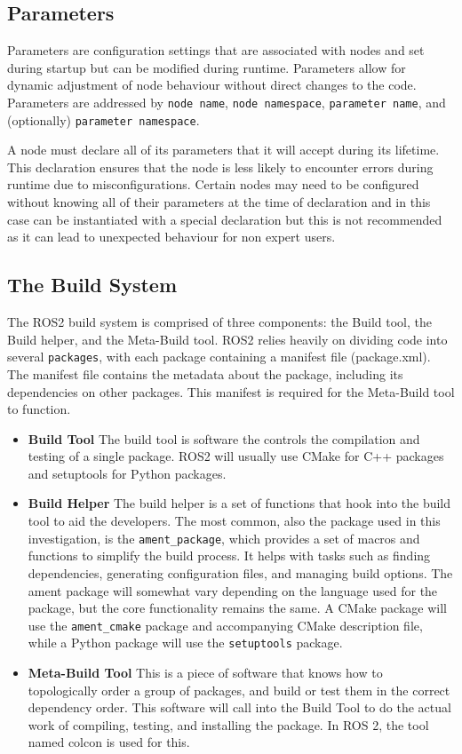 \documentclass[10pt,a4paper,english]{article}
\begin{document}
\subsection{Parameters}
Parameters are configuration settings that are associated with nodes and set during startup but can be modified during runtime. Parameters allow for dynamic adjustment of node behaviour without direct changes to the code. Parameters are addressed by \texttt{node name}, \texttt{node namespace}, \texttt{parameter name}, and (optionally) \texttt{parameter namespace}. \par
A node must declare all of its parameters that it will accept during its lifetime. This declaration ensures that the node is less likely to encounter errors during runtime due to misconfigurations. Certain nodes may need to be configured without knowing all of their parameters at the time of declaration and in this case can be instantiated with a special declaration but this is not recommended as it can lead to unexpected behaviour for non expert users. \par

\subsection{The Build System}
The ROS2 build system is comprised of three components: the Build tool, the Build helper, and the Meta-Build tool. ROS2 relies heavily on dividing code into several \texttt{packages}, with each package containing a manifest file (package.xml). The manifest file contains the metadata about the package, including its dependencies on other packages. This manifest is required for the Meta-Build tool to function.

\begin{itemize}
    \item \textbf{Build Tool}
    The build tool is software the controls the compilation and testing of a single package. ROS2 will usually use CMake for C++ packages and setuptools for Python packages.
    \item \textbf{Build Helper}
    The build helper is a set of functions that hook into the build tool to aid the developers. The most common, also the package used in this investigation, is the \texttt{ament\_package}, which provides a set of macros and functions to simplify the build process. It helps with tasks such as finding dependencies, generating configuration files, and managing build options. The ament package will somewhat vary depending on the language used for the package, but the core functionality remains the same. A CMake package will use the \texttt{ament\_cmake} package and accompanying CMake description file, while a Python package will use the \texttt{setuptools} package.
    \item \textbf{Meta-Build Tool}
    This is a piece of software that knows how to topologically order a group of packages, and build or test them in the correct dependency order. This software will call into the Build Tool to do the actual work of compiling, testing, and installing the package. In ROS 2, the tool named colcon is used for this.
\end{itemize}
\end{document}
